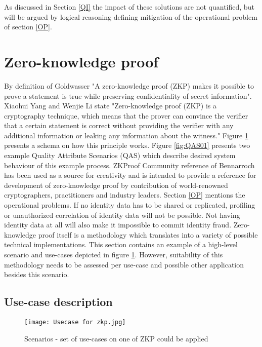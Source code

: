 As discussed in Section \ref{QI} the impact of these solutions are not quantified, but will be argued by logical reasoning defining mitigation of the operational problem of section \ref{OP}.


\section{Zero-knowledge proof}
By definition of Goldwasser \etal \cite{Goldwasser} "A zero-knowledge proof (ZKP) makes it possible to prove a statement is true while preserving confidentiality of secret information". 
Xiaohui Yang and Wenjie Li \cite{YANG2020102050} state "Zero-knowledge proof (ZKP) is a cryptography technique, which means that the prover can convince the verifier that a certain statement is correct without providing the verifier with any additional information or leaking any information about the witness." Figure \ref{fig:ZKP_usecase} presents a schema on how this principle works. Figure \ref{fig:QAS01} presents two example Quality Attribute Scenarios (QAS) which describe desired system behaviour of this example process. ZKProof Community reference \cite{2019:zkproof:community-reference-0.2} of Bennarroch \etal has been used as a source for creativity and is intended to provide a reference for development of zero-knowledge proof by contribution of world-renowned cryptographers, practitioners and industry leaders. Section \ref{OP} mentions the operational problems. If no identity data has to be shared or replicated, profiling or unauthorized correlation of identity data will not be possible. Not having identity data at all will also make it impossible to commit identity fraud. 
Zero-knowledge proof itself is a methodology which translates into a variety of possible technical implementations. This section contains an example of a high-level scenario and use-cases depicted in figure \ref{fig:ZKP_usecase}. However, suitability of this methodology needs to be assessed per use-case and possible other application besides this scenario. 

\subsection{Use-case description}\label{UC_description}
    
    \begin{figure}
    \graphicspath{ {./images/} }
        \texttt{[image: Usecase for zkp.jpg]}\\
        \centering
        \caption{Scenarios - set of use-cases on one of ZKP could be applied}
        \label{fig:ZKP_usecase}
    \end{figure}


